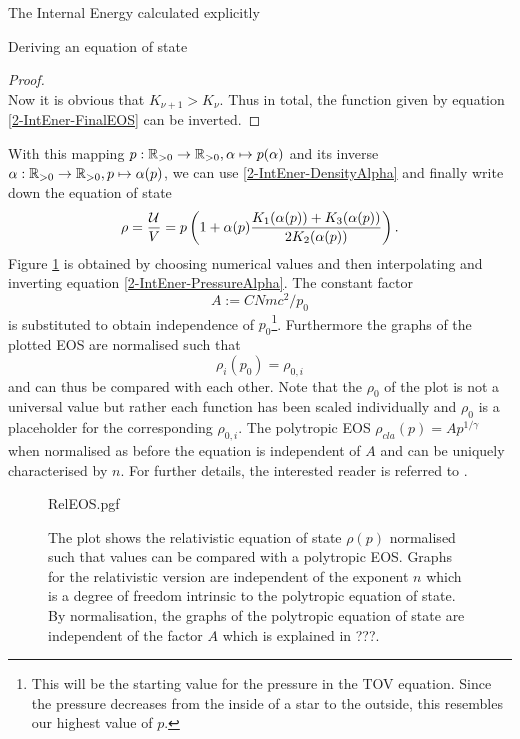 \begin{section}{The Internal Energy calculated explicitly}
\begin{subsection}{Deriving an equation of state}
\begin{proof}
\begin{equation}
	\end{equation}
	Now it is obvious that $K_{\nu+1}>K_\nu$. Thus in total, the function given by equation \ref{2-IntEner-FinalEOS} can be inverted.
\end{proof}%
%
%
\noindent With this mapping $p:\mathbb{R}_{>0}\rightarrow \mathbb{R}_{>0},\alpha\mapsto p(\alpha)$ and its inverse $\alpha:\mathbb{R}_{>0}\rightarrow \mathbb{R}_{>0},p\mapsto \alpha(p)$, we can use \ref{2-IntEner-DensityAlpha} and finally write down the equation of state 
\begin{equation}
	\rho = \frac{\mathcal{U}}{V} = p\left(1+\alpha(p)\frac{K_1(\alpha(p))+K_3(\alpha(p))}{2K_2(\alpha(p))}\right).
	\label{2-IntEner-FinalEOS}
\end{equation}
Figure \ref{2-IntEner-RelEOSPlot} is obtained by choosing numerical values and then interpolating and inverting equation \ref{2-IntEner-PressureAlpha}. The constant factor 
\begin{equation}
	A:=CNmc^2/p_0
\end{equation}
is substituted to obtain independence of $p_0$\footnote{This will be the starting value for the pressure in the TOV equation. Since the pressure decreases from the inside of a star to the outside, this resembles our highest value of $p$.}. Furthermore the graphs of the plotted EOS are normalised such that
\begin{equation}
	\rho_{i}(p_0)=\rho_{0,i}
\end{equation}
and can thus be compared with each other. Note that the $\rho_0$ of the plot is not a universal value but rather each function has been scaled individually and $\rho_0$ is a placeholder for the corresponding $\rho_{0,i}$. The polytropic EOS $\rho_{cla}(p)=Ap^{1/\gamma}$ when normalised as before the equation is independent of $A$ and can be uniquely characterised by $n$. For further details, the interested reader is referred to \cite{pleyerGithubRepositoryJonas}.
\begin{figure}[H]
	\centering
	{RelEOS.pgf}
	\caption[Relativistic Equation of State]{The plot shows the relativistic equation of state $\rho(p)$ normalised such that values can be compared with a polytropic EOS. Graphs for the relativistic version are independent of the exponent $n$ which is a degree of freedom intrinsic to the polytropic equation of state. By normalisation, the graphs of the polytropic equation of state are independent of the factor $A$ which is explained in ???.} %
	\label{2-IntEner-RelEOSPlot}
\end{figure}
\end{subsection}
%
%
\end{section}
